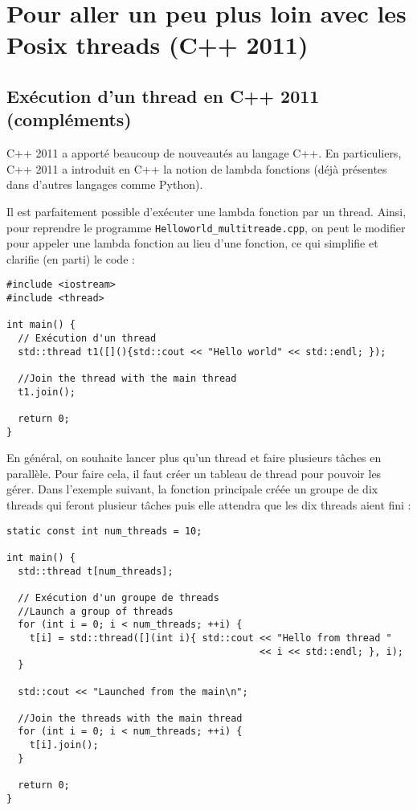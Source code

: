 \documentclass[fleqn,11pt]{article}
\begin{document}
\section{Pour aller un peu plus loin avec les Posix threads (C++ 2011)}

\subsection{Exécution d'un thread en C++ 2011 (compléments)}

C++ 2011 a apporté beaucoup de nouveautés au langage C++. En particuliers, C++ 2011 a introduit
en C++ la notion de lambda fonctions (déjà présentes dans d'autres langages comme Python).

Il est parfaitement possible d'exécuter une lambda fonction par un thread. Ainsi,
pour reprendre le programme \texttt{Helloworld\_multitreade.cpp}, on peut le modifier
pour appeler une lambda fonction au lieu d'une fonction, ce qui simplifie et clarifie
(en parti) le code :

\begin{lstlisting}
#include <iostream>
#include <thread>

int main() {
  // Exécution d'un thread
  std::thread t1([](){std::cout << "Hello world" << std::endl; });

  //Join the thread with the main thread
  t1.join();

  return 0;
}
\end{lstlisting}

En général, on souhaite lancer plus qu'un thread et faire plusieurs tâches en parallèle. Pour faire cela,
il faut créer un tableau de thread pour pouvoir les gérer. 
Dans l'exemple suivant, la fonction principale créée un groupe de dix threads  qui feront plusieur tâches puis elle attendra que les dix threads aient fini :

\begin{lstlisting}
static const int num_threads = 10;

int main() {
  std::thread t[num_threads];

  // Exécution d'un groupe de threads
  //Launch a group of threads
  for (int i = 0; i < num_threads; ++i) {
    t[i] = std::thread([](int i){ std::cout << "Hello from thread " 
                                            << i << std::endl; }, i);
  }

  std::cout << "Launched from the main\n";

  //Join the threads with the main thread
  for (int i = 0; i < num_threads; ++i) {
    t[i].join();
  }

  return 0;
}
\end{lstlisting}
\end{document}
